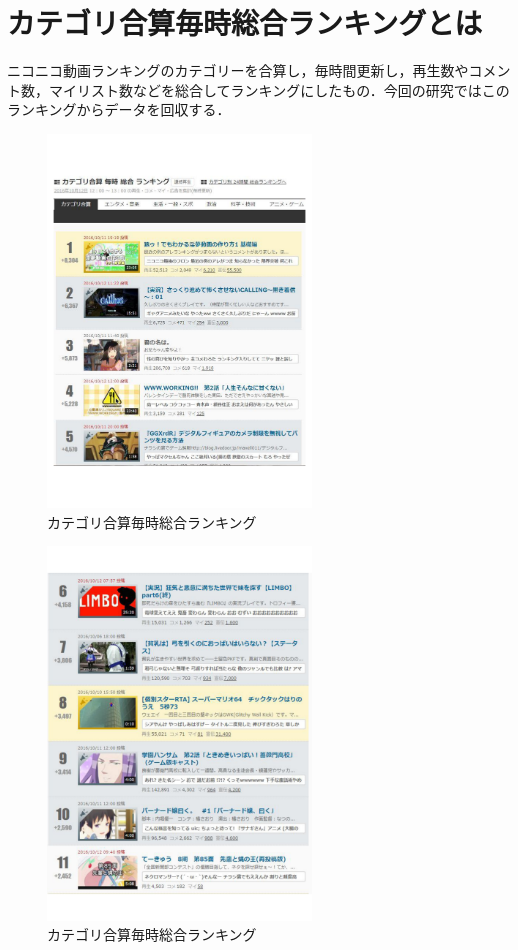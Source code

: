 \section{カテゴリ合算毎時総合ランキングとは}
ニコニコ動画ランキングのカテゴリーを合算し，毎時間更新し，再生数やコメント数，マイリスト数などを総合してランキングにしたもの．今回の研究ではこのランキングからデータを回収する．

\begin{figure}[htb]
\centering
\includegraphics[width=7cm]{r01.pdf}
\caption{カテゴリ合算毎時総合ランキング}\label{aab}
\end{figure}

\begin{figure}[htb]
\centering
\includegraphics[width=7cm]{r02.pdf}
\caption{カテゴリ合算毎時総合ランキング}\label{aac}
\end{figure}

